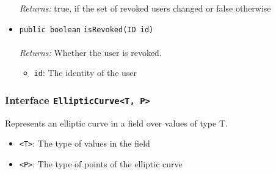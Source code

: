 \begin{itemize}
\emph{Returns:} true, if the set of revoked users changed or false otherwise

\item \lstinline|public boolean| \lstinline|isRevoked|\lstinline|(ID id)|\\ \\[-0.6em]
\emph{Returns:} Whether the user is revoked.
\begin{itemize}
\item \lstinline|id|: The identity of the user
\end{itemize}



\end{itemize}

\subsubsection{Interface \lstinline|EllipticCurve<T, P>|}
Represents an elliptic curve in a field over values of type T. \\
\noindent\begin{minipage}[t]{5cm}
\vspace{0.3em}
\hspace*{2em}
\vspace{0.3em}
\end{minipage}

\begin{itemize}
\item \lstinline|<T>|: The type of values in the field
\item \lstinline|<P>|: The type of points of the elliptic curve
\end{itemize}




